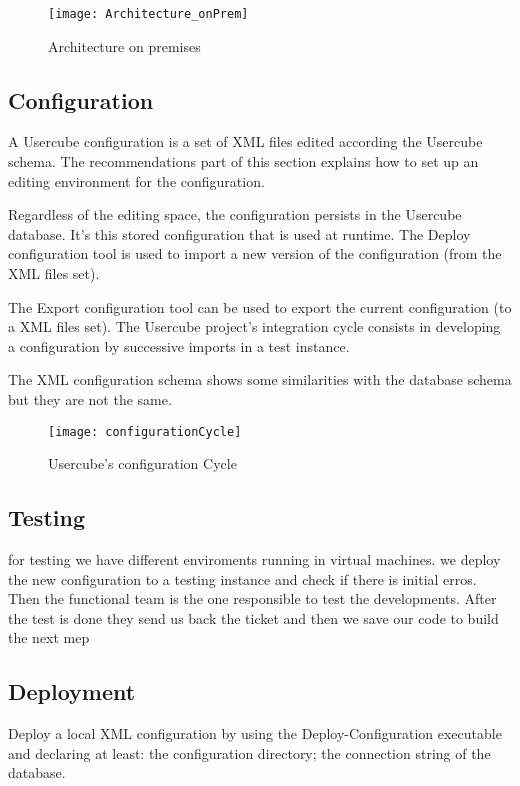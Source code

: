 \begin{figure}[htbp]
  \centering
  \texttt{[image: Architecture\_onPrem]}
  \caption{Architecture on premises}
  \label{fig:Architecture_onPrem}
\end{figure}

\subsection{Configuration}

A Usercube configuration is a set of XML files edited according the Usercube schema. The recommendations part of this section explains how to set up an editing environment for the configuration.

Regardless of the editing space, the configuration persists in the Usercube database. It's this stored configuration that is used at runtime. The Deploy configuration tool is used to import a new version of the configuration (from the XML files set).

The Export configuration tool can be used to export the current configuration (to a XML files set). The Usercube project's integration cycle consists in developing a configuration by successive imports in a test instance.

The XML configuration schema shows some similarities with the database schema but they are not the same.

\begin{figure}[htbp]
  \centering
  \texttt{[image: configurationCycle]}
  \caption{Usercube's configuration Cycle}
  \label{fig:configurationCycle}
\end{figure}

\subsection{Testing}


for testing we have different enviroments running in virtual machines. we deploy the new configuration to a testing instance and check if there is initial erros. Then the functional team is the one responsible to test the developments. After the test is done they send us back the ticket and then we save our code to build the next mep

\subsection{Deployment}


Deploy a local XML configuration by using the Deploy-Configuration executable and declaring at least: the configuration directory; the connection string of the database.
